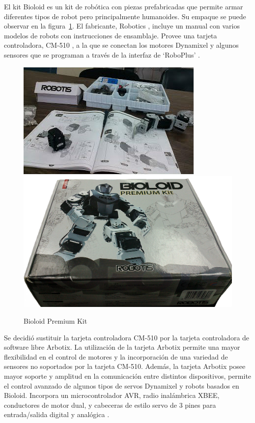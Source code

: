 El kit Bioloid es un kit de robótica con piezas prefabricadas que permite armar diferentes tipos de robot pero principalmente humanoides. Su empaque se puede observar en la figura~\ref{fig:kit}. El fabricante, Robotics \cite{robotics}, incluye un manual  con varios modelos de robots con instrucciones de ensamblaje. Provee una tarjeta controladora, CM-510 \cite{cm510}, a la que se conectan los motores Dynamixel y algunos sensores que se programan a través de la interfaz de ‘RoboPlus’ \cite{robotics}.

\begin{figure}[hbtp]
\centering
\includegraphics[scale=0.5]{imagenes/kitAfuera.jpg}
\includegraphics[scale=0.07]{imagenes/cajaKit.jpg}
\caption{Bioloid Premium Kit}
\label{fig:kit}
\end{figure}

Se decidi\'o sustituir la tarjeta controladora CM-510 por la tarjeta controladora de software libre Arbotix. La utilización de la tarjeta Arbotix permite una mayor flexibilidad en el control de motores y la incorporación de una variedad de sensores no soportados por la tarjeta CM-510.
Además, la tarjeta Arbotix posee mayor soporte y amplitud en la comunicación entre distintos dispositivos, permite el control avanzado de algunos tipos de servos Dynamixel y robots basados en Bioloid. Incorpora un microcontrolador \gls{AVR}, radio inalámbrica \gls{XBEE}, conductores de motor dual, y cabeceras de estilo servo de 3 pines para entrada/salida digital y analógica \cite{arbotix}.

